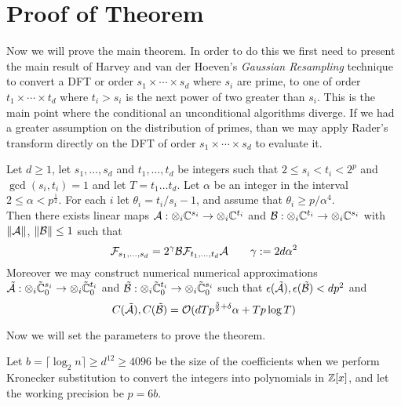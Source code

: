 \medskip

\section{Proof of Theorem}%
\label{sec:proof-of-theorem}

Now we will prove the main theorem. In order to do this we first need to present the main result of Harvey and van der Hoeven's \emph{Gaussian Resampling} technique to convert a DFT or order $s_1 \times \cdots \times s_d$ where $s_i$ are prime, to one of order $t_1 \times \cdots \times t_d$ where $t_i > s_i$ is the next power of two greater than $s_i$. This is the main point where the conditional an unconditional algorithms diverge. If we had a greater assumption on the distribution of primes, than we may apply Rader's transform directly on the DFT of order $s_1 \times \cdots \times s_d$ to evaluate it.

\begin{theorem}
    Let $d \geq 1$, let $s_1, \ldots, s_d$ and $t_1, \ldots, t_d$ be integers such that $2 \leq s_i < t_i < 2^p$ and $\gcd(s_i, t_i) = 1$ and let $T = t_1\ldots t_d$. Let $\alpha$ be an integer in the interval $2 \leq \alpha < p^{\frac{1}{2}}$. For each $i$ let $\theta_i = t_i / s_i - 1$, and assume that $\theta_i \geq p/\alpha^4$.\\
    Then there exists linear maps $\mathcal A: \otimes_i {\mathbb C}^{s_i} \to \otimes_i {\mathbb C}^{t_i}$ and $\mathcal B: \otimes_i {\mathbb C}^{t_i} \to \otimes_i {\mathbb C}^{s_i}$ with $\|\mathcal A\|$, $\|\mathcal B\| \leq 1$ such that
    \[
        \mathcal F_{s_1, \ldots, s_d} = 2^\gamma \mathcal B \mathcal F_{t_1, \ldots, t_d} \mathcal A \qquad \gamma := 2d\alpha^2
    \]
    Moreover we may construct numerical numerical approximations $\tilde{\mathcal A}: \otimes_i \tilde{{\mathbb C}}^{s_i}_0 \to \otimes_i \tilde{{\mathbb C}}^{t_i}_0$ and $\tilde{\mathcal B}: \otimes_i \tilde{{\mathbb C}}^{t_i}_0 \to \otimes_i \tilde{{\mathbb C}}^{s_i}_0$  such that $\epsilon(\tilde{\mathcal A}), \epsilon(\tilde{\mathcal B}) < dp^2$ and
    \[
        C(\tilde{\mathcal A}), C(\tilde{\mathcal B}) = \mathcal O(dTp^{{\frac{3}{2}} + \delta}\alpha + Tp\log T)
    \]
\end{theorem}

\medskip

Now we will set the parameters to prove the theorem.

Let $b = \lceil \log_2 n\rceil \geq d^{12} \geq 4096$ be the size of the coefficients when we perform Kronecker substitution to convert the integers into polynomials in ${\mathbb Z}[x]$, and let the working precision be $p = 6b$.

